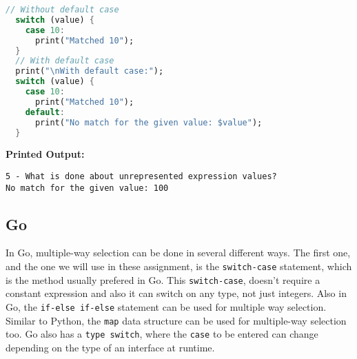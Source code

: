 \documentclass{article}
\begin{document}
\begin{itemize}
\begin{lstlisting}[language=Dart]
  // Without default case
  switch (value) {
    case 10:
      print("Matched 10");
  }
  // With default case
  print("\nWith default case:");
  switch (value) {
    case 10:
      print("Matched 10");
    default:
      print("No match for the given value: $value");
  }
\end{lstlisting}
\textbf{Printed Output:} \begin{verbatim}
5 - What is done about unrepresented expression values?
No match for the given value: 100
\end{verbatim}
\end{itemize}
\newpage




\subsection{Go}
In Go, multiple-way selection can be done in several different ways. The first one, and the one we will use in these assignment, is the \texttt{switch-case} statement, which is the method usually prefered in Go. This \texttt{switch-case}, doesn't require a constant expression and also it can switch on any type, not just integers. Also in Go, the \texttt{if-else if-else} statement can be used for multiple way selection. Similar to Python, the \texttt{map} data structure can be used for multiple-way selection too. Go also has a \texttt{type switch}, where the \texttt{case} to be entered can change depending on the type of an interface at runtime.
\end{document}
